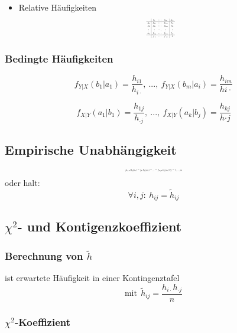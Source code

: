 \documentclass[10pt,a4paper,landscape]{article}
\begin{document}
\begin{multicols}{4}
\begin{itemize}
\item Relative Häufigkeiten
\[ \resizebox{0.1\textwidth}{!}{$
\begin{array}{c|ccc|c}
  & b_1 & \cdots & b_m & h_{1\cdot} \\
\hline
a_1 & f_{11} & \cdots & f_{1m} & f_{1\cdot} \\
a_2 & f_{21} & \cdots & f_{2m} & f_{2\cdot} \\
\vdots & \vdots & \ddots & \vdots & \vdots \\
a_k & f_{k1} & \cdots & f_{km} & f_{k\cdot} \\
\hline
  & f_{\cdot 1} & \cdots & f_{\cdot m} & 1
\end{array}
$}
\]

\end{itemize}

\subsubsection*{Bedingte Häufigkeiten}

\[
f_{Y|X}(b_1|a_1)=\frac{h_{i1}}{h_{i\cdot}},~...,~ f_{Y|X}(b_m|a_i)=\frac{h_{im}}{h{i\cdot}}
\]

\[
f_{X|Y}(a_1|b_1)=\frac{h_{1j}}{h_{\cdot j}},~...,~ f_{X|Y}(a_k|b_j)=\frac{h_{kj}}{h{\cdot j}}
\]

\subsection{Empirische Unabhängigkeit}
\[ \resizebox{0.2\textwidth}{!}{$
f_{Y|X}(b_j|a_1)=f_Y(b_j|a_2)=...=f_{Y|X}(b_j|a_k)\forall j=1,...,m
$}
\]
oder halt:
\[
\forall i,j: ~ h_{ij}=\tilde{h}_{ij}
\]

\subsection{$\chi^2$- und Kontigenzkoeffizient}

\subsubsection*{Berechnung von $\tilde{h}$}
ist erwartete Häufigkeit in einer Kontingenztafel
\[
\text{mit}~~ \tilde{h}_{ij}=\frac{h_{i\cdot}h_{\cdot j}}{n}
\]

\subsubsection*{$\chi^2$-Koeffizient}


\end{multicols}
\end{document}
